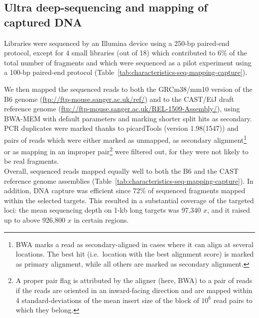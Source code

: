 \subsection{Ultra deep-sequencing and mapping of captured DNA}

Libraries were sequenced by an Illumina device using a 250-bp paired-end protocol, except for 4 small libraries (out of 18) which contributed to 6\% of the total number of fragments and which were sequenced as a pilot experiment using a 100-bp paired-end protocol (Table~\ref{tab:characteristics-seq-mapping-capture}). 

We then mapped the sequenced reads to both the GRCm38/mm10 version of the B6 genome (\url{ftp://ftp-mouse.sanger.ac.uk/ref/}) and to the CAST/EiJ draft reference genome (\url{ftp://ftp-mouse.sanger.ac.uk/REL-1509-Assembly/}), using BWA-MEM \citep{li2009fast, li2013aligning} with default parameters and marking shorter split hits as secondary.
PCR duplicates were marked thanks to picardTools (version 1.98(1547)) \citep{picard2018toolkit} and pairs of reads which were either marked as unmapped, as secondary alignment\footnote{BWA marks a read as secondary-aligned in cases where it can align at several locations. The best hit (i.e.\ location with the best alignment score) is marked as primary alignment, while all others are marked as secondary alignment.} or as mapping in an improper pair\footnote{A proper pair flag is attributed by the aligner (here, BWA) to a pair of reads if the reads are oriented in an inward-facing direction and are mapped within 4 standard-deviations of the mean insert size of the block of $10^6$ read pairs to which they belong.} were filtered out, for they were not likely to be real fragments.\\

Overall, sequenced reads mapped equally well to both the B6 and the CAST reference genome assemblies (Table~\ref{tab:characteristics-seq-mapping-capture}).
In addition, DNA capture was efficient since 72\% of sequenced fragments mapped within the selected targets.
This resulted in a substantial coverage of the targeted loci: the mean sequencing depth on 1-kb long targets was 97,340 $x$, and it raised up to above 926,800 $x$ in certain regions.

